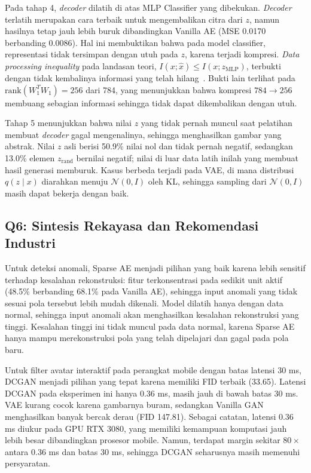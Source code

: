 \documentclass{article}
\begin{document}
Pada tahap 4, \textit{decoder} dilatih di atas MLP Classifier yang dibekukan. \textit{Decoder} terlatih merupakan cara terbaik untuk mengembalikan citra dari $z$, namun hasilnya tetap jauh lebih buruk dibandingkan Vanilla AE (MSE 0.0170 berbanding 0.0086). Hal ini membuktikan bahwa pada model classifier, representasi tidak tersimpan dengan utuh pada $z$, karena terjadi kompresi. \textit{Data processing inequality} pada landasan teori, $I(x;\hat x) \le I(x;z_{\text{MLP}})$, terbukti dengan tidak kembalinya informasi yang telah hilang~\cite{cover2006}. Bukti lain terlihat pada $\mathrm{rank}(W_1^T W_1) = 256$ dari 784, yang menunjukkan bahwa kompresi $784 \to 256$ membuang sebagian informasi sehingga tidak dapat dikembalikan dengan utuh.

Tahap 5 menunjukkan bahwa nilai $z$ yang tidak pernah muncul saat pelatihan membuat \textit{decoder} gagal mengenalinya, sehingga menghasilkan gambar yang abstrak. Nilai $z$ asli berisi 50.9\% nilai nol dan tidak pernah negatif, sedangkan 13.0\% elemen $z_{\text{rand}}$ bernilai negatif; nilai di luar data latih inilah yang membuat hasil generasi memburuk. Kasus berbeda terjadi pada VAE, di mana distribusi $q(z\mid x)$ diarahkan menuju $\mathcal{N}(0,I)$ oleh KL, sehingga sampling dari $\mathcal{N}(0,I)$ masih dapat bekerja dengan baik.

\subsection{Q6: Sintesis Rekayasa dan Rekomendasi Industri}
Untuk deteksi anomali, Sparse AE menjadi pilihan yang baik karena lebih sensitif terhadap kesalahan rekonstruksi: fitur terkonsentrasi pada sedikit unit aktif (48.5\% berbanding 68.1\% pada Vanilla AE), sehingga input anomali yang tidak sesuai pola tersebut lebih mudah dikenali. Model dilatih hanya dengan data normal, sehingga input anomali akan menghasilkan kesalahan rekonstruksi yang tinggi. Kesalahan tinggi ini tidak muncul pada data normal, karena Sparse AE hanya mampu merekonstruksi pola yang telah dipelajari dan gagal pada pola baru.

Untuk filter avatar interaktif pada perangkat mobile dengan batas latensi 30 ms, DCGAN menjadi pilihan yang tepat karena memiliki FID terbaik (33.65). Latensi DCGAN pada eksperimen ini hanya 0.36 ms, masih jauh di bawah batas 30 ms. VAE kurang cocok karena gambarnya buram, sedangkan Vanilla GAN menghasilkan banyak bercak derau (FID 147.81). Sebagai catatan, latensi 0.36 ms diukur pada GPU RTX 3080, yang memiliki kemampuan komputasi jauh lebih besar dibandingkan prosesor mobile. Namun, terdapat margin sekitar $80\times$ antara 0.36 ms dan batas 30 ms, sehingga DCGAN seharusnya masih memenuhi persyaratan.
\end{document}
